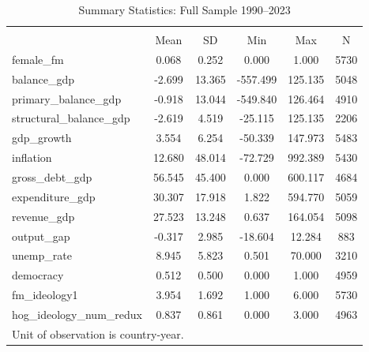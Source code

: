 \begin{table}[htbp]\centering
\def\sym#1{\ifmmode^{#1}\else\(^{#1}\)\fi}
\caption{Summary Statistics: Full Sample 1990--2023}
\begin{tabular}{l*{1}{ccccc}}
\hline\hline
            &\multicolumn{5}{c}{}                                            \\
            &        Mean&          SD&         Min&         Max&           N\\
\hline
female\_fm   &       0.068&       0.252&       0.000&       1.000&        5730\\
balance\_gdp &      -2.699&      13.365&    -557.499&     125.135&        5048\\
primary\_balance\_gdp&      -0.918&      13.044&    -549.840&     126.464&        4910\\
structural\_balance\_gdp&      -2.619&       4.519&     -25.115&     125.135&        2206\\
gdp\_growth  &       3.554&       6.254&     -50.339&     147.973&        5483\\
inflation   &      12.680&      48.014&     -72.729&     992.389&        5430\\
gross\_debt\_gdp&      56.545&      45.400&       0.000&     600.117&        4684\\
expenditure\_gdp&      30.307&      17.918&       1.822&     594.770&        5059\\
revenue\_gdp &      27.523&      13.248&       0.637&     164.054&        5098\\
output\_gap  &      -0.317&       2.985&     -18.604&      12.284&         883\\
unemp\_rate  &       8.945&       5.823&       0.501&      70.000&        3210\\
democracy   &       0.512&       0.500&       0.000&       1.000&        4959\\
fm\_ideology1&       3.954&       1.692&       1.000&       6.000&        5730\\
hog\_ideology\_num\_redux&       0.837&       0.861&       0.000&       3.000&        4963\\
\hline\hline
\multicolumn{6}{l}{\footnotesize Unit of observation is country-year.}\\
\end{tabular}
\end{table}

